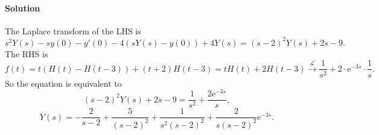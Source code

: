 \documentclass[hyperref, a4paper]{article}
\newcommand*{\ee}{\mathrm{e}}
\begin{document}
\paragraph*{Solution} The Laplace transform of the LHS is 
\[
    s^2 Y(s) - s y(0) - y'(0) 
    - 4 (s Y(s) - y(0)) 
    + 4 Y(s) = 
    (s-2)^2 Y(s) + 2s - 9.
\]
The RHS is 
\[
    f(t) = t (H(t) - H(t-3)) + (t + 2) H(t - 3) 
    = t H(t) + 2 H(t - 3) \stackrel{\mathcal{L}}{\longrightarrow}
    \frac{1}{s^2} + 2 \cdot \ee^{-3s} \cdot \frac{1}{s}.
\]
So the equation is equivalent to 
\[
    (s - 2)^2 Y(s) + 2s - 9 = \frac{1}{s^2} + \frac{2 \ee^{- 3s}}{s},
\]
\begin{equation}
    Y(s) = - \frac{2}{s - 2} + \frac{5}{(s - 2)^2}
    + \frac{1}{s^2 (s - 2)^2}
    + \frac{2}{s (s - 2)^2} \ee^{-3 s}.
\end{equation}
\end{document}
